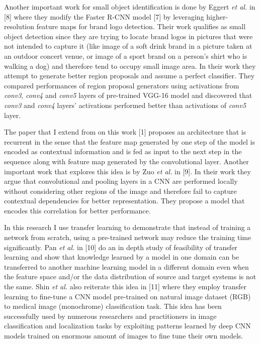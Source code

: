 \documentclass [11pt,letterpaper ,twoside ,openany ]{report}
\begin{document}
    Another important work for small object identification is done by Eggert \textit{et al.} in [8] where they modify the Faster R-CNN model [7] by leveraging higher-resolution feature maps for brand logo detection. Their work qualifies as small object detection since they are trying to locate brand logos in pictures that were not intended to capture it (like  image of a soft drink brand in a picture taken at an outdoor concert venue, or image of a sport brand on a person's shirt who is walking a dog) and therefore tend to occupy small image area. In their work they attempt to generate better region proposals and assume a perfect classifier. They compared performances of  region proposal generators using activations from \textit{conv3}, \textit{conv4} and \textit{conv5} layers of pre-trained VGG-16 model and discovered that \textit{conv3} and \textit{conv4} layers' activations performed better than activations of \textit{conv5} layer. 

    The paper that I extend from on this work [1] proposes an architecture that is recurrent in the sense that the feature map generated by one step of the model is encoded as contextual information and is fed as input to the next step in the sequence along with feature map generated by the convolutional layer. Another important work that explores this idea is by Zuo \textit {et al.} in [9]. In their work they argue that convolutional and pooling layers in a CNN are performed locally without considering other regions of the image and therefore fail to capture contextual dependencies for better representation. They propose a model that encodes this correlation for better performance.

    In this research I use transfer learning to demonstrate that instead of training a network from scratch, using a pre-trained network may reduce  the training time significantly. Pan \textit {et al.} in [10] do an in depth study of feasibility of transfer learning and show that knowledge learned by a model in one domain can be transferred to another machine learning model in a different domain even when the feature space and/or the data distribution of source and target systems is not the same. Shin \textit {et al.} also reiterate this idea in [11] where they employ transfer learning to fine-tune a CNN model pre-trained on natural image dataset (RGB) to medical image (monochrome) classification task. This idea has been successfully used by numerous researchers and practitioners in image classification and localization tasks by exploiting patterns learned by deep CNN models trained on enormous amount of images to fine tune their own models. 
\end{document}
